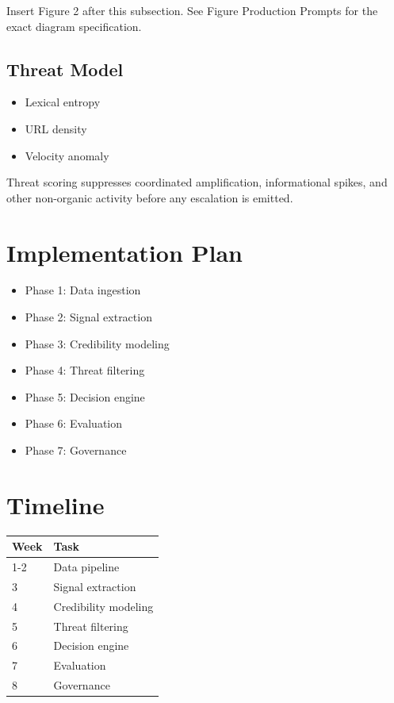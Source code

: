 \documentclass[11pt]{article}
\begin{document}
Insert Figure 2 after this subsection. See Figure Production Prompts for the exact diagram specification.

\subsection{Threat Model}

\begin{itemize}[leftmargin=*]
\item Lexical entropy
\item URL density
\item Velocity anomaly
\end{itemize}

Threat scoring suppresses coordinated amplification, informational spikes, and other non-organic activity before any escalation is emitted.

\section{Implementation Plan}

\begin{itemize}[leftmargin=*]
\item Phase 1: Data ingestion
\item Phase 2: Signal extraction
\item Phase 3: Credibility modeling
\item Phase 4: Threat filtering
\item Phase 5: Decision engine
\item Phase 6: Evaluation
\item Phase 7: Governance
\end{itemize}

\section{Timeline}

\begin{tabular}{l l}
\toprule
Week & Task \\
\midrule
1-2 & Data pipeline \\
3 & Signal extraction \\
4 & Credibility modeling \\
5 & Threat filtering \\
6 & Decision engine \\
7 & Evaluation \\
8 & Governance \\
\bottomrule
\end{tabular}
\end{document}
